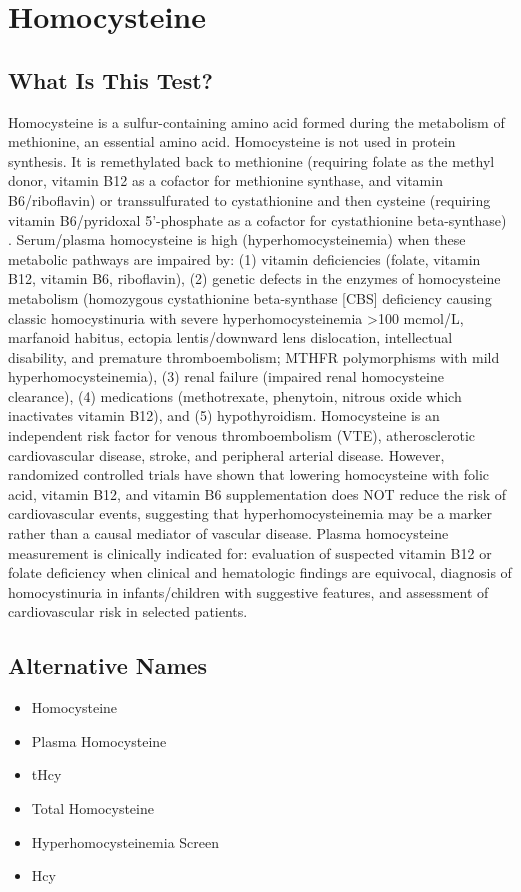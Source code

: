 \chapter{Homocysteine}
\section*{What Is This Test?}
Homocysteine is a sulfur-containing amino acid formed during the metabolism of methionine, an essential amino acid. Homocysteine is not used in protein synthesis. It is remethylated back to methionine (requiring folate as the methyl donor, vitamin B12 as a cofactor for methionine synthase, and vitamin B6/riboflavin) or transsulfurated to cystathionine and then cysteine (requiring vitamin B6/pyridoxal 5'-phosphate as a cofactor for cystathionine beta-synthase) \cite{selhub1999homocysteine}. Serum/plasma homocysteine is high (hyperhomocysteinemia) when these metabolic pathways are impaired by: (1) vitamin deficiencies (folate, vitamin B12, vitamin B6, riboflavin), (2) genetic defects in the enzymes of homocysteine metabolism (homozygous cystathionine beta-synthase [CBS] deficiency causing classic homocystinuria with severe hyperhomocysteinemia >100 mcmol/L, marfanoid habitus, ectopia lentis/downward lens dislocation, intellectual disability, and premature thromboembolism; MTHFR polymorphisms with mild hyperhomocysteinemia), (3) renal failure (impaired renal homocysteine clearance), (4) medications (methotrexate, phenytoin, nitrous oxide which inactivates vitamin B12), and (5) hypothyroidism. Homocysteine is an independent risk factor for venous thromboembolism (VTE), atherosclerotic cardiovascular disease, stroke, and peripheral arterial disease. However, randomized controlled trials have shown that lowering homocysteine with folic acid, vitamin B12, and vitamin B6 supplementation does NOT reduce the risk of cardiovascular events, suggesting that hyperhomocysteinemia may be a marker rather than a causal mediator of vascular disease. Plasma homocysteine measurement is clinically indicated for: evaluation of suspected vitamin B12 or folate deficiency when clinical and hematologic findings are equivocal, diagnosis of homocystinuria in infants/children with suggestive features, and assessment of cardiovascular risk in selected patients.
\section*{Alternative Names}
\begin{itemize}
  \item Homocysteine
  \item Plasma Homocysteine
  \item tHcy
  \item Total Homocysteine
  \item Hyperhomocysteinemia Screen
  \item Hcy
\end{itemize}
